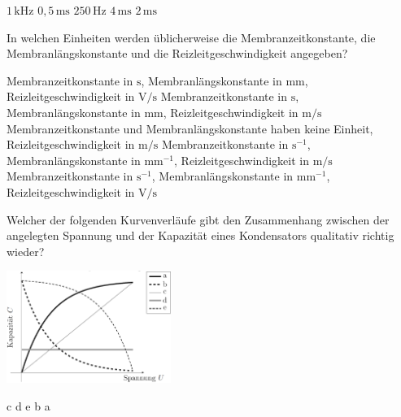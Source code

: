 \documentclass[11pt]{exam}
\begin{document}
\begin{questions}
\begin{choices}
	\choice \(\mathrm{1\,kHz}\)
	\choice \(\mathrm{0,5\,ms}\)
	\choice \(\mathrm{250\,Hz}\)
	\choice \(\mathrm{4\,ms}\)
	\choice \(\mathrm{2\,ms}\)
\end{choices}

\vspace{3mm}\question In welchen Einheiten werden üblicherweise die Membranzeitkonstante, die Membranlängskonstante und die Reizleitgeschwindigkeit angegeben?

\begin{choices}
	\choice Membranzeitkonstante in \(\mathrm{s}\), Membranlängskonstante in \(\mathrm{mm}\), Reizleitgeschwindigkeit in \(\mathrm{V/s}\)
	\choice Membranzeitkonstante in \(\mathrm{s}\), Membranlängskonstante in \(\mathrm{mm}\), Reizleitgeschwindigkeit in \(\mathrm{m/s}\)
	\choice Membranzeitkonstante und Membranlängskonstante haben keine Einheit, Reizleitgeschwindigkeit in \(\mathrm{m/s}\)
	\choice Membranzeitkonstante in \(\mathrm{s^{-1}}\), Membranlängskonstante in \(\mathrm{mm^{-1}}\), Reizleitgeschwindigkeit in \(\mathrm{m/s}\)
	\choice Membranzeitkonstante in \(\mathrm{s^{-1}}\), Membranlängskonstante in \(\mathrm{mm^{-1}}\), Reizleitgeschwindigkeit in \(\mathrm{V/s}\)
\end{choices}

\vspace{3mm}\question Welcher der folgenden Kurvenverläufe gibt den Zusammenhang zwischen der angelegten Spannung und der Kapazität eines Kondensators qualitativ richtig wieder? 

\includegraphics[width=0.4\textwidth]{images/Kondensator-C-U.png}

\begin{choices}
	\choice c
	\choice d
	\choice e
	\choice b
	\choice a
\end{choices}

\vspace{3mm}\end{questions}
\end{document}
